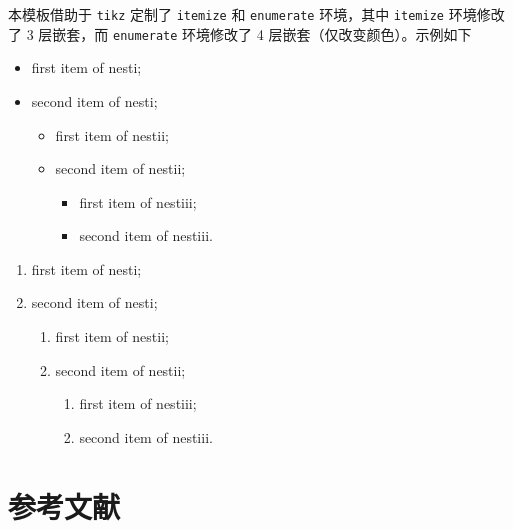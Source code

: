 \documentclass[cn,11pt,fancy,hide]{elegantbook}
\providecommand{\tightlist}{%
  \setlength{\itemsep}{0pt}\setlength{\parskip}{0pt}}
\begin{document}
本模板借助于 \texttt{tikz} 定制了 \texttt{itemize} 和 \texttt{enumerate} 环境，其中 \texttt{itemize} 环境修改了 3 层嵌套，而 \texttt{enumerate} 环境修改了 4 层嵌套（仅改变颜色）。示例如下


\begin{minipage}{0.5\textwidth}
\begin{itemize}
\tightlist
\item
  first item of nesti;
\item
  second item of nesti;

  \begin{itemize}
  \tightlist
  \item
    first item of nestii;
  \item
    second item of nestii;

    \begin{itemize}
    \tightlist
    \item
      first item of nestiii;
    \item
      second item of nestiii.
    \end{itemize}
  \end{itemize}
\end{itemize}
\end{minipage}
\begin{minipage}{0.5\textwidth}
\begin{enumerate}
\def\labelenumi{\arabic{enumi}.}
\tightlist
\item
  first item of nesti;
\item
  second item of nesti;

  \begin{enumerate}
  \def\labelenumii{\arabic{enumii}.}
  \tightlist
  \item
    first item of nestii;
  \item
    second item of nestii;

    \begin{enumerate}
    \def\labelenumiii{\arabic{enumiii}.}
    \tightlist
    \item
      first item of nestiii;
    \item
      second item of nestiii.
    \end{enumerate}
  \end{enumerate}
\end{enumerate}
\end{minipage}


\hypertarget{ref}{%
\section{参考文献}\label{ref}}
\end{document}
